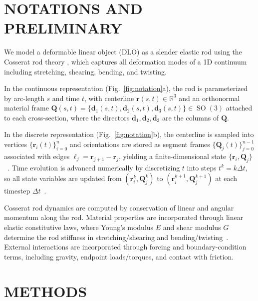 \documentclass[letterpaper, 10 pt, conference]{ieeeconf}  %
\begin{document}
\section{NOTATIONS AND PRELIMINARY}

We model a deformable linear object (DLO) as a slender elastic rod using the Cosserat rod theory \cite{nonlinear_elas, pyelastica_notation}, which captures all deformation modes of a 1D continuum including stretching, shearing, bending, and twisting.

In the continuous representation (Fig.~\ref{fig:notation}a), the rod is parameterized by arc-length $s$ and time $t$, with centerline $\mathbf{r}(s,t)\in\mathbb{R}^3$ and an orthonormal material frame $\mathbf{Q}(s,t)=\{\mathbf{d}_1(s,t),\mathbf{d}_2(s,t),\mathbf{d}_3(s,t)\}\in \operatorname{SO}(3)$ attached to each cross-section, where the directors $\mathbf{d}_1,\mathbf{d}_2,\mathbf{d}_3$ are the columns of $\mathbf{Q}$.

In the discrete representation (Fig.~\ref{fig:notation}b), the centerline is sampled into vertices $\{\mathbf{r}_i(t)\}_{i=0}^{n}$ and orientations are stored as segment frames $\{\mathbf{Q}_j(t)\}_{j=0}^{n-1}$ associated with edges $\boldsymbol{\ell}_j=\mathbf{r}_{j+1}-\mathbf{r}_j$, yielding a finite-dimensional state $\{\mathbf{r}_i,\mathbf{Q}_j\}$~\cite{pyelastica_notation, discrete_elas, pyelastica_web}.
Time evolution is advanced numerically by discretizing $t$ into steps $t^k=k\Delta t$, so all state variables are updated from $(\mathbf{r}_i^{k},\mathbf{Q}_j^{k})$ to $(\mathbf{r}_i^{k+1},\mathbf{Q}_j^{k+1})$ at each timestep $\Delta t$~\cite{pyelastica_paper}.

Cosserat rod dynamics are computed by conservation of linear and angular momentum along the rod.
Material properties are incorporated through linear elastic constitutive laws, where Young's modulus $E$ and shear modulus $G$ determine the rod stiffness in stretching/shearing and bending/twisting~\cite{cosserat_theory}. External interactions are incorporated through forcing and boundary-condition terms, including gravity, endpoint loads/torques, and contact with friction.



\section{METHODS}
\end{document}
